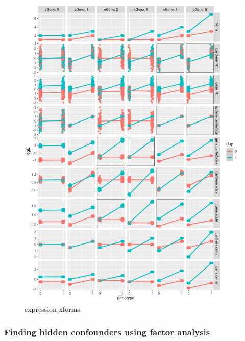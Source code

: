 \begin{figure}
    \centering
    \includegraphics[width=1.0\textwidth,page=1]{mainmatter/figures/chapter_03/simulate_expression_transforms.pdf}
    \caption{expression xforms}
    \label{fig:hird_eQTL_expressionTransform_sims}
\end{figure}

\subsubsection{Finding hidden confounders using factor analysis}

